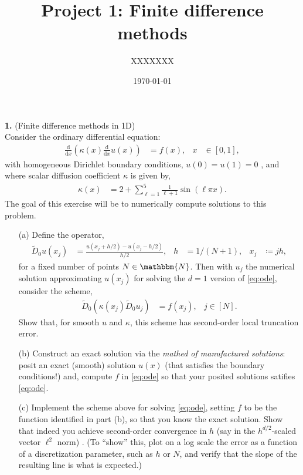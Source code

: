 \documentclass[11pt]{amsart}
\title{Project 1: Finite difference methods}
\author{XXXXXXX}
\date{\today}
\newcommand{\mathd}{\textrm{d}}
\newcommand{\ddx}[1]{\frac{\mathd}{\mathd #1}}
\newcommand{\N}{\mathbbm{N}}
\begin{document}
\maketitle

\noindent\textbf{1.} (Finite difference methods in 1D)\\
Consider the ordinary differential equation:
\begin{align}\label{eq:ode}
  \ddx{x} \left(\kappa(x) \ddx{x} u(x) \right) &= f(x), & x &\in [0,1],
\end{align}
with homogeneous Dirichlet boundary conditions, $u(0) = u(1) = 0$ , and where scalar diffusion coefficient $\kappa$ is given by,
  \begin{align*}
    \kappa(x) &= 2 + \sum_{\ell=1}^{5} \frac{1}{\ell+1} \sin( \ell \pi x ).
  \end{align*}
  The goal of this exercise will be to numerically compute solutions to this problem. \\[8pt]
  \begin{itemize}
    \item[(a)] Define the operator,
      \begin{align*}
        \widetilde{D}_0 u(x_j) &= \frac{u(x_j + h/2) - u(x_j - h/2)}{h/2}, & h &= 1/(N+1), & x_j &\coloneqq j h,
      \end{align*}
      for a fixed number of points $N \in \N$. Then with $u_j$ the numerical solution approximating $u(x_j)$ for solving the $d=1$ version of \eqref{eq:ode}, consider the scheme,
      \begin{align}\label{eq:D0-def}
        \widetilde{D}_0 \left( \kappa(x_j) \widetilde{D}_0 u_j \right) &= f(x_j), & j \in [N].
      \end{align}
      Show that, for smooth $u$ and $\kappa$, this scheme has second-order local truncation error.
    \item[(b)] Construct an exact solution via the \textit{mathed of manufactured solutions}: posit an exact (smooth) solution $u(x)$ (that satisfies the boundary conditions!) and, compute $f$ in \eqref{eq:ode} so that your posited solutions satifies \eqref{eq:ode}. 
    \item[(c)] Implement the scheme above for solving \eqref{eq:ode}, setting $f$ to be the function identified in part (b), so that you know the exact solution. Show that indeed you achieve second-order convergence in $h$ (say in the $h^{d/2}$-scaled vector $\ell^2$ norm) . (To ``show'' this, plot on a log scale the error as a function of a discretization parameter, such as $h$ or $N$, and verify that the slope of the resulting line is what is expected.)
  \end{itemize}
\end{document}
